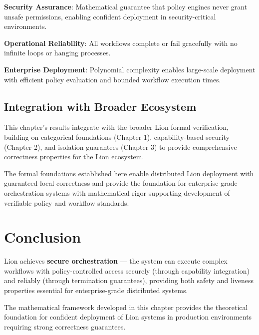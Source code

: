 \textbf{Security Assurance}: Mathematical guarantee that policy engines never grant unsafe permissions, enabling confident deployment in security-critical environments.

\textbf{Operational Reliability}: All workflows complete or fail gracefully with no infinite loops or hanging processes.

\textbf{Enterprise Deployment}: Polynomial complexity enables large-scale deployment with efficient policy evaluation and bounded workflow execution times.

\subsection{Integration with Broader Ecosystem}

This chapter's results integrate with the broader Lion formal verification, building on categorical foundations (Chapter 1), capability-based security (Chapter 2), and isolation guarantees (Chapter 3) to provide comprehensive correctness properties for the Lion ecosystem.

The formal foundations established here enable distributed Lion deployment with guaranteed local correctness and provide the foundation for enterprise-grade orchestration systems with mathematical rigor supporting development of verifiable policy and workflow standards.

\newpage

\section{Conclusion}

Lion achieves \textbf{secure orchestration} — the system can execute complex workflows with policy-controlled access securely (through capability integration) and reliably (through termination guarantees), providing both safety and liveness properties essential for enterprise-grade distributed systems.

The mathematical framework developed in this chapter provides the theoretical foundation for confident deployment of Lion systems in production environments requiring strong correctness guarantees.

\newpage

